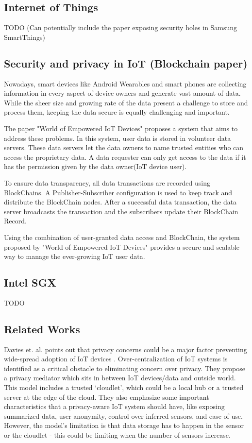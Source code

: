 \subsection{Internet of Things}
TODO
(Can potentially include the paper exposing security holes in Samsung SmartThings)

\subsection{Security and privacy in IoT (Blockchain paper)}
Nowadays, smart devices like Android Wearables and smart phones are collecting information in every aspect of device owners and generate vast amount of data. While the sheer size and growing rate of the data present a challenge to store and process them, keeping the data secure is equally challenging and important.

The paper "World of Empowered IoT Devices" proposes a system that aims to address these problems. In this system, user data is stored in volunteer data servers. These data servers let the data owners to name trusted entities who can access the proprietary data. A data requester can only get access to the data if it has the permission given by the data owner(IoT device user). 

To ensure data transparency, all data transactions are recorded using BlockChains. A Publisher-Subscriber configuration is used to keep track and distribute the BlockChain nodes. After a successful data transaction, the data server broadcasts the transaction and the subscribers update their BlockChain Record.

Using the combination of user-granted data access and BlockChain, the system proposed by "World of Empowered IoT Devices" provides a secure and scalable way to manage the ever-growing IoT user data.

\subsection{Intel SGX}
TODO

\subsection{Related Works}
Davies et. al. points out that privacy concerns could be a major factor preventing wide-spread adoption of IoT devices \cite{davies}. Over-centralization of IoT systems is identified as a critical obstacle to eliminating concern over privacy. They propose a privacy mediator which sits in between IoT devices/data and outside world. This model includes a trusted `cloudlet', which could be a local hub or a trusted server at the edge of the cloud. They also emphasize some important characteristics that a privacy-aware IoT system should have, like exposing summarized data, user anonymity, control over inferred sensors, and ease of use. However, the model's limitation is that data storage has to happen in the sensor or the cloudlet - this could be limiting when the number of sensors increase.

